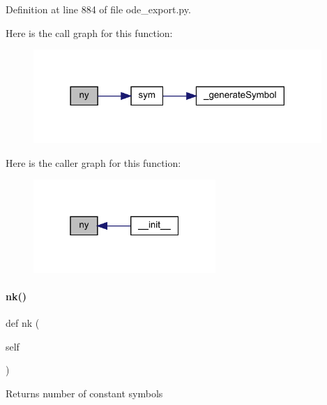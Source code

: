 Definition at line 884 of file ode\+\_\+export.\+py.

Here is the call graph for this function\+:
\nopagebreak
\begin{figure}[H]
\begin{center}
\leavevmode
\includegraphics[width=310pt]{classamici_1_1ode__export_1_1_o_d_e_model_ac3d9b681827ebea0e5bee18c9d7fc44d_cgraph}
\end{center}
\end{figure}
Here is the caller graph for this function\+:
\nopagebreak
\begin{figure}[H]
\begin{center}
\leavevmode
\includegraphics[width=196pt]{classamici_1_1ode__export_1_1_o_d_e_model_ac3d9b681827ebea0e5bee18c9d7fc44d_icgraph}
\end{center}
\end{figure}
\mbox{\label{classamici_1_1ode__export_1_1_o_d_e_model_a07767f24c77537a68972e99a79ef93aa}} 
\paragraph{\texorpdfstring{nk()}{nk()}}
{\footnotesize\ttfamily def nk (\begin{DoxyParamCaption}\item[{}]{self }\end{DoxyParamCaption})}

\begin{DoxyReturn}{Returns}
number of constant symbols 
\end{DoxyReturn}



